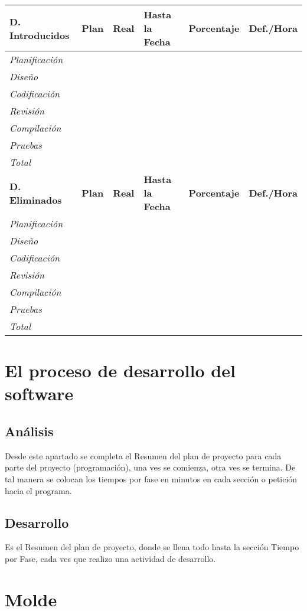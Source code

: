 \documentclass[a4paper,12pt,openany,oneside]{book}
\begin{document}
\newpage
\begin{tabular}{| l | l | l | l | l | l |}
\hline
\textbf{D. Introducidos} & \textbf{Plan} & \textbf{Real} & \textbf{Hasta la Fecha} & \textbf{Porcentaje} & \textbf{Def./Hora} \\
\hline
\textit{Planificación} & & & & & \\
\hline
\textit{Diseño} & & & & & \\
\hline
\textit{Codificación} & & & & & \\
\hline
\textit{Revisión} & & & & & \\
\hline
\textit{Compilación} & & & & & \\
\hline
\textit{Pruebas} & & & & & \\
\hline
\textit{Total} & & & & & \\
\hline
\textbf{D. Eliminados} & \textbf{Plan} & \textbf{Real} & \textbf{Hasta la Fecha} & \textbf{Porcentaje} & \textbf{Def./Hora} \\
\hline
\textit{Planificación} & & & & & \\
\hline
\textit{Diseño} & & & & & \\
\hline
\textit{Codificación} & & & & & \\
\hline
\textit{Revisión} & & & & & \\
\hline
\textit{Compilación} & & & & & \\
\hline
\textit{Pruebas} & & & & & \\
\hline
\textit{Total} & & & & & \\
\hline
\end{tabular}
\chapter{El proceso de desarrollo del software}
\thispagestyle{empty}
\section{Análisis}
Desde este apartado se completa el Resumen del plan de proyecto para cada parte del proyecto (programación), una ves se comienza, otra ves se termina. De tal manera se colocan los tiempos por fase en minutos en cada sección o petición hacia el programa.
\section{Desarrollo}
Es el Resumen del plan de proyecto, donde se llena todo hasta la sección Tiempo por Fase, cada ves que realizo una actividad de desarrollo.
\chapter{Molde}
\thispagestyle{empty}
\end{document}
